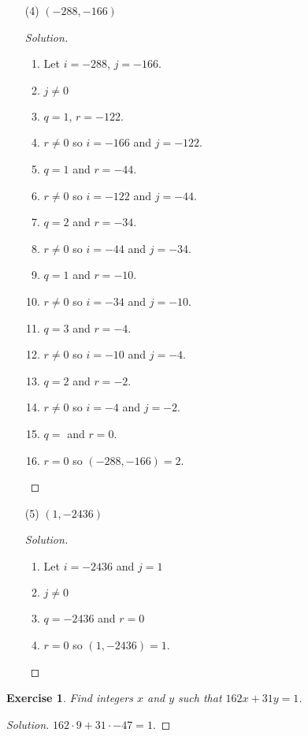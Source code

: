 \documentclass[12pt,leqno]{article}
\numberwithin{equation}{section}
\newtheorem{exer}[thm]{Exercise}
\theoremstyle{definition}
\begin{document}
\begin{enumerate}
\pagebreak
    \item[(4)] $(-288, -166)$
    \begin{proof}[Solution]$ $\\
    \begin{enumerate}[1.]
    \item
    Let $i = -288$, $j = -166$.
    \item
    $j \neq 0$
    \item
    $q = 1$, $r = -122$.
    \item
    $r \neq 0$ so $i = -166$ and $j = -122$.
    \item
    $q = 1$ and $r = -44$.
    \item
    $r \neq 0$ so $i = -122$ and $j = -44$.
    \item
    $q = 2$ and $r = -34$.
    \item
    $r \neq 0$ so $i = -44$ and $j = -34$.
    \item
    $q = 1$ and $r = -10$.
    \item
    $r \neq 0$ so $i = -34$ and $j = -10$.
    \item
    $q = 3$ and $r = -4$.
    \item
    $r \neq 0$ so $i = -10$ and $j = -4$.
    \item
    $q = 2$ and $r = -2$.
    \item
    $r \neq 0$ so $i = -4$ and $j = -2$.
    \item
    $q = $ and $r = 0$.
    \item
    $r = 0$ so $(-288, -166) = 2$.
    \end{enumerate}    
    \end{proof}

\pagebreak
    \item[(5)] $(1,-2436)$
    \begin{proof}[Solution]$ $\\
    \begin{enumerate}[1.]
    \item
    Let $i = -2436$ and $j = 1$
    \item
    $j \neq 0$
    \item
    $q = -2436$ and $r = 0$
    \item
    $r = 0$ so $(1, -2436) = 1$.
    \end{enumerate}
    \end{proof}

\end{enumerate}

\begin{exer}
Find integers $x$ and $y$ such that $162x + 31y = 1$.
\end{exer}

\begin{proof}[Solution]
$162 \cdot 9 + 31 \cdot -47 = 1$.
\end{proof}
\end{document}
